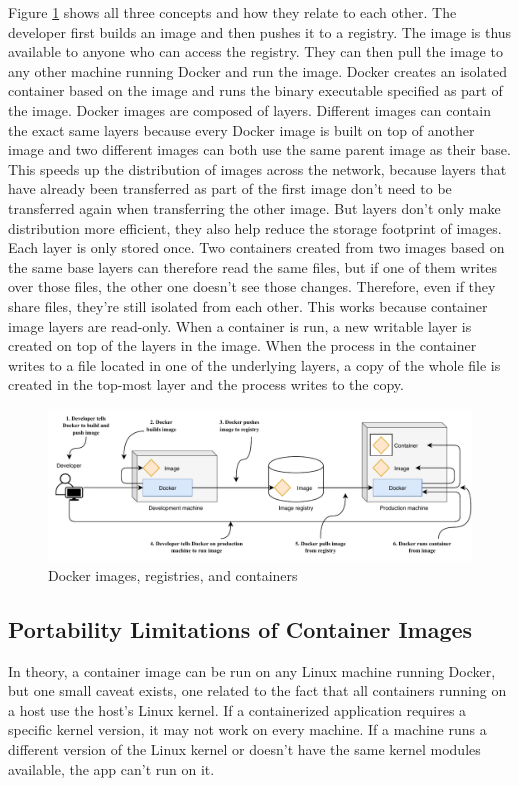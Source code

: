 Figure \ref{fig:dockerflow} shows all three concepts and how they relate to each other. The developer first builds an image and then pushes it to a registry. The image is thus available to anyone who can access the registry. They can then pull the image to any other machine running Docker and run the image. Docker creates an isolated container based on the image and runs the binary executable specified as part of the image.
Docker images are composed of layers. Different images can contain the exact same layers because every Docker image is built on top of another image and two different images can both use the same parent image as their base. This speeds up the distribution of images across the network, because layers that have already been transferred as part of the first image don’t need to be transferred again when transferring the other image.
But layers don’t only make distribution more efficient, they also help reduce the storage footprint of images. Each layer is only stored once. Two containers created from two images based on the same base layers can therefore read the same files, but if one of them writes over those files, the other one doesn’t see those changes. Therefore, even if they share files, they’re still isolated from each other. This works because container image layers are read-only. When a container is run, a new writable layer is created on top of the layers in the image. When the process in the container writes to a file located in one of the underlying layers, a copy of the whole file is created in the top-most layer and the process writes to the copy.

\begin{figure}[htbp]
	\centering
	\includegraphics[width=\textwidth]{images/dockerflow.pdf}
	\caption{Docker images, registries, and containers}
	\label{fig:dockerflow}
\end{figure}

\subsection{Portability Limitations of Container Images}
In theory, a container image can be run on any Linux machine running Docker, but one small caveat exists, one related to the fact that all containers running on a host use the host’s Linux kernel. If a containerized application requires a specific kernel version, it may not work on every machine. If a machine runs a different version of the Linux kernel or doesn’t have the same kernel modules available, the app can’t run on it.

